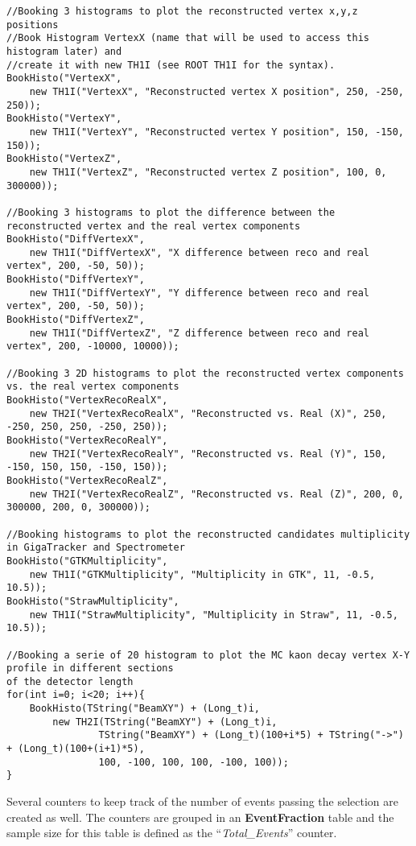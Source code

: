 \documentclass{article}
\newcommand{\class}[1]{\textbf{#1}}
\newcommand{\refcode}[1]{``\textit{#1}''}
\begin{document}
\begin{lstlisting}
//Booking 3 histograms to plot the reconstructed vertex x,y,z positions
//Book Histogram VertexX (name that will be used to access this histogram later) and 
//create it with new TH1I (see ROOT TH1I for the syntax).
BookHisto("VertexX", 
	new TH1I("VertexX", "Reconstructed vertex X position", 250, -250, 250));
BookHisto("VertexY", 
	new TH1I("VertexY", "Reconstructed vertex Y position", 150, -150, 150));
BookHisto("VertexZ", 
	new TH1I("VertexZ", "Reconstructed vertex Z position", 100, 0, 300000));

//Booking 3 histograms to plot the difference between the reconstructed vertex and the real vertex components
BookHisto("DiffVertexX", 
	new TH1I("DiffVertexX", "X difference between reco and real vertex", 200, -50, 50));
BookHisto("DiffVertexY", 
	new TH1I("DiffVertexY", "Y difference between reco and real vertex", 200, -50, 50));
BookHisto("DiffVertexZ", 
	new TH1I("DiffVertexZ", "Z difference between reco and real vertex", 200, -10000, 10000));

//Booking 3 2D histograms to plot the reconstructed vertex components vs. the real vertex components
BookHisto("VertexRecoRealX", 
	new TH2I("VertexRecoRealX", "Reconstructed vs. Real (X)", 250, -250, 250, 250, -250, 250));
BookHisto("VertexRecoRealY", 
	new TH2I("VertexRecoRealY", "Reconstructed vs. Real (Y)", 150, -150, 150, 150, -150, 150));
BookHisto("VertexRecoRealZ", 
	new TH2I("VertexRecoRealZ", "Reconstructed vs. Real (Z)", 200, 0, 300000, 200, 0, 300000));

//Booking histograms to plot the reconstructed candidates multiplicity in GigaTracker and Spectrometer
BookHisto("GTKMultiplicity", 
	new TH1I("GTKMultiplicity", "Multiplicity in GTK", 11, -0.5, 10.5));
BookHisto("StrawMultiplicity", 
	new TH1I("StrawMultiplicity", "Multiplicity in Straw", 11, -0.5, 10.5));

//Booking a serie of 20 histogram to plot the MC kaon decay vertex X-Y profile in different sections
of the detector length 
for(int i=0; i<20; i++){
	BookHisto(TString("BeamXY") + (Long_t)i, 
		new TH2I(TString("BeamXY") + (Long_t)i,
				TString("BeamXY") + (Long_t)(100+i*5) + TString("->") + (Long_t)(100+(i+1)*5),
				100, -100, 100, 100, -100, 100));
}
\end{lstlisting}

Several counters to keep track of the number of events passing the selection are created as well.
The counters are grouped in an \class{EventFraction} table and the sample size for this table is
defined as the \refcode{Total\_Events} counter.
\end{document}

